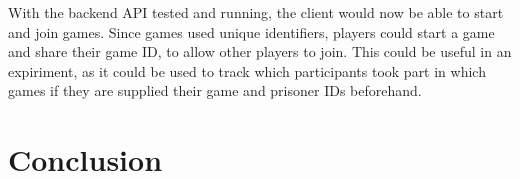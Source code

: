 \documentclass[12pt]{article}
\begin{document}
With the backend API tested and running, the client would now be able to start and join games. Since games used unique identifiers, players could start a game and share their game ID, to allow other players to join. This could be useful in an expiriment, as it could be used to track which participants took part in which games if they are supplied their game and prisoner IDs beforehand. 

\part*{Conclusion}



\end{document}
